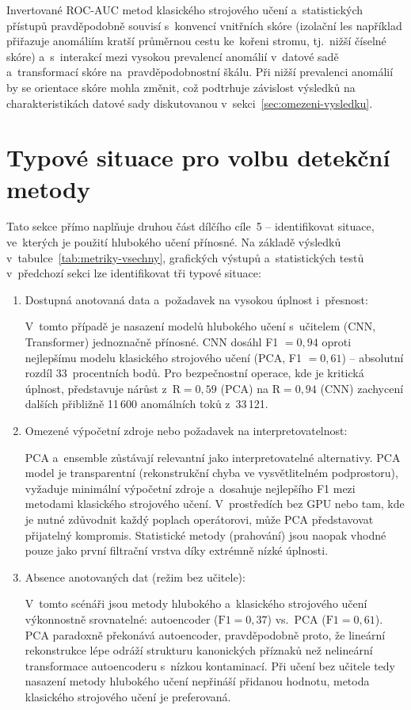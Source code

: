 Invertované ROC-AUC metod klasického strojového učení a~statistických přístupů pravděpodobně souvisí s~konvencí vnitřních skóre (izolační les například přiřazuje anomáliím kratší průměrnou cestu ke~kořeni stromu, tj.~nižší číselné skóre) a~s~interakcí mezi vysokou prevalencí anomálií v~datové sadě a~transformací skóre na~pravděpodobnostní škálu. Při nižší prevalenci anomálií by se orientace skóre mohla změnit, což podtrhuje závislost výsledků na charakteristikách datové sady diskutovanou v~sekci~\ref{sec:omezeni-vysledku}.

\section{Typové situace pro volbu detekční metody}
\label{sec:identifikace-situaci}

Tato sekce přímo naplňuje druhou část dílčího cíle~5 -- identifikovat situace, ve~kterých je použití hlubokého učení přínosné. Na základě výsledků v~tabulce~\ref{tab:metriky-vsechny}, grafických výstupů a~statistických testů v~předchozí sekci lze identifikovat tři typové situace:

\begin{enumerate}
\item Dostupná anotovaná data a~požadavek na vysokou úplnost i~přesnost:

V~tomto případě je nasazení modelů hlubokého učení s~učitelem (CNN, Transformer) jednoznačně přínosné. CNN dosáhl F1 $= 0{,}94$ oproti nejlepšímu modelu klasického strojového učení (PCA, F1 $= 0{,}61$) -- absolutní rozdíl 33~procentních bodů. Pro bezpečnostní operace, kde je kritická úplnost, představuje nárůst z~$\text{R} = 0{,}59$ (PCA) na $\text{R} = 0{,}94$ (CNN) zachycení dalších přibližně 11\,600 anomálních toků z~33\,121.

\item Omezené výpočetní zdroje nebo požadavek na interpretovatelnost:

PCA a~ensemble zůstávají relevantní jako interpretovatelné alternativy. PCA model je transparentní (rekonstrukční chyba ve vysvětlitelném podprostoru), vyžaduje minimální výpočetní zdroje a~dosahuje nejlepšího F1 mezi metodami klasického strojového učení. V~prostředích bez GPU nebo tam, kde je nutné zdůvodnit každý poplach operátorovi, může PCA představovat přijatelný kompromis. Statistické metody (prahování) jsou naopak vhodné pouze jako první filtrační vrstva díky extrémně nízké úplnosti.

\item Absence anotovaných dat (režim bez učitele):

V~tomto scénáři jsou metody hlubokého a~klasického strojového učení výkonnostně srovnatelné: autoencoder ($\text{F1} = 0{,}37$) vs.\ PCA ($\text{F1} = 0{,}61$). PCA paradoxně překonává autoencoder, pravděpodobně proto, že lineární rekonstrukce lépe odráží strukturu kanonických příznaků než nelineární transformace autoencoderu s~nízkou kontaminací. Při učení bez učitele tedy nasazení metody hlubokého učení nepřináší přidanou hodnotu, metoda klasického strojového učení je preferovaná.
\end{enumerate}

